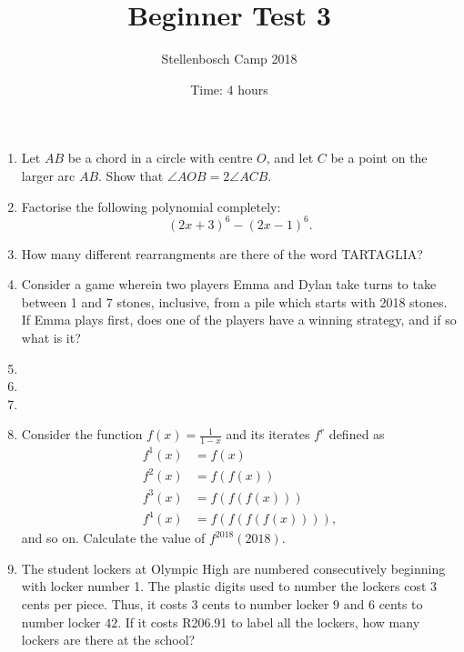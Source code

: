 \documentclass{article}
\title{Beginner Test 3}
\author{Stellenbosch Camp 2018}
\date{Time: $4$ hours}
\begin{document}
\maketitle

\begin{enumerate}[1.]

\vspace{6pt}
\item 
Let $AB$ be a chord in a circle with centre $O$, and let $C$ be a point on the larger arc $AB$. Show that $\angle AOB = 2\angle ACB$.


\vspace{6pt}
\item 
Factorise the following polynomial completely: \[ (2x+3)^6 -(2x-1)^6. \]


\vspace{6pt}
\item 
How many different rearrangments are there of the word TARTAGLIA?


\vspace{6pt}
\item 
Consider a game wherein two players Emma and Dylan take turns to take between 1 and 7 stones, inclusive, from a pile which starts with 2018 stones. If Emma plays first, does one of the players have a winning strategy, and if so what is it?


\vspace{6pt}
\item 


\vspace{6pt}
\item 


\vspace{6pt}
\item 


\vspace{6pt}
\item 
Consider the function $f(x) = \frac{1}{1-x}$ and its iterates $f^r$ defined as
\begin{align*}
  f^1(x) &= f(x) \\
  f^2(x) &= f(f(x)) \\
  f^3(x) &= f(f(f(x))) \\
  f^4(x) &= f(f(f(f(x)))),
\end{align*}
and so on. Calculate the value of $f^{2018}(2018)$.


\vspace{6pt}
\item %
The student lockers at Olympic High are numbered consecutively beginning with locker number 1. The plastic digits used to number the lockers cost $3$ cents per piece. Thus, it costs $3$ cents to number locker $9$ and $6$ cents to number locker $42$. If it costs R206.91 to label all the lockers, how many lockers are there at the school?



\end{enumerate}
\end{document}
